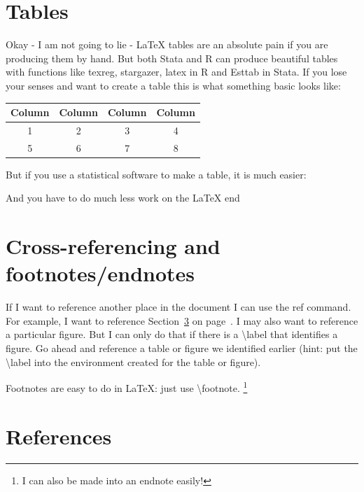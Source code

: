 \documentclass{article}
\begin{document}
\newpage 
\section{Tables}

Okay - I am not going to lie - LaTeX tables are an absolute pain if you are producing them by hand. But both Stata and R can produce beautiful tables with functions like texreg, stargazer, latex in R and Esttab in Stata. If you lose your senses and want to create a table this is what something basic looks like:

\begin{center}
  \begin{tabular}{||c c c c||} %
    \hline
    Column & Column & Column & Column \\ %
    \hline\hline
    1 & 2 & 3 & 4 \\ 
    \hline
    5 & 6 & 7 & 8 \\
    \hline
  \end{tabular}
\end{center}

\noindent But if you use a statistical software to make a table, it is much easier:



\noindent And you have to do much less work on the LaTeX end



\newpage \section{Cross-referencing and footnotes/endnotes} %

If I want to reference another place in the document I can use the ref command. For example, I want to reference Section~\ref{sec:citations} on page~\pageref{sec:citations}. I may also want to reference a particular figure. But I can only do that if there is a \textbackslash label that identifies a figure. Go ahead and reference a table or figure we identified earlier (hint: put the \textbackslash label into the environment created for the table or figure). 

Footnotes are easy to do in LaTeX: just use \textbackslash footnote. \footnote{I can also be made into an endnote easily!}

\newpage 
\section{References} \label{sec:citations} %
\end{document}
